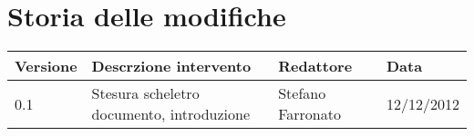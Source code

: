 %

\newcommand{\docName}{Piano di Qualifica}
\newcommand{\docFileName}{piano di qualifica}
\newcommand{\docVers}{1.0}
\newcommand{\creationDate}{05/12/2012}
\newcommand{\modificationDate}{06/12/2012}
\newcommand{\docState}{Non approvato}
\newcommand{\docUsage}{Interno}
\newcommand{\docAuthors}{Stefano Farronato\\ &Boh Qualcun'altro}
\newcommand{\approvedBy}{}
\newcommand{\verifiedBy}{}
\newcommand{\docRoot}{..}







\section*{Storia delle modifiche}
\begin{tabularx}{\textwidth}{lXll}
\toprule
Versione & Descrzione intervento & Redattore & Data\\
\midrule %
0.1 & Stesura scheletro documento, introduzione & Stefano Farronato & 12/12/2012\\
\bottomrule
\end{tabularx}
\newpage

